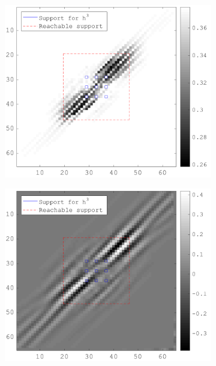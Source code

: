 \begin{figure}[!h]
\begin{subfigure}[b]{0.49\textwidth}
\end{subfigure}
   \begin{subfigure}[b]{0.49\textwidth}\centering
    \includegraphics[width=\textwidth]{figures/xp/xp_128x128_sc2_angl1_K3_S3_node3_obj_matrix.png}
    \end{subfigure}
    \begin{subfigure}[b]{0.49\textwidth}\centering
    \includegraphics[width=\textwidth]{figures/xp/xp_128x128_sc2_angl1_K3_S3_node3_gradient_node_3.png}
    \end{subfigure}
\end{figure}


